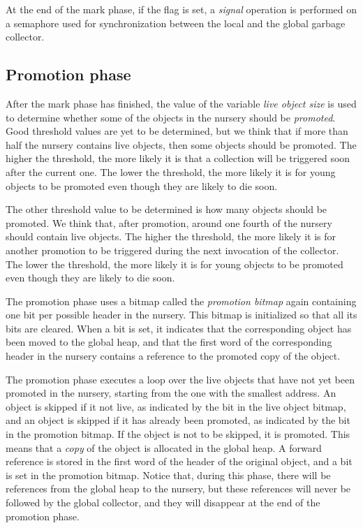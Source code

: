 At the end of the mark phase, if the flag is set, a \emph{signal}
operation is performed on a semaphore used for synchronization between
the local and the global garbage collector.

\subsection{Promotion phase}

After the mark phase has finished, the value of the variable
\emph{live object size} is used to determine whether some of the
objects in the nursery should be \emph{promoted}.  Good threshold
values are yet to be determined, but we think that if more than half
the nursery contains live objects, then some objects should be
promoted.  The higher the threshold, the more likely it is that a
collection will be triggered soon after the current one.  The lower
the threshold, the more likely it is for young objects to be promoted
even though they are likely to die soon.

The other threshold value to be determined is how many objects should
be promoted.  We think that, after promotion, around one fourth of the
nursery should contain live objects.  The higher the threshold, the
more likely it is for another promotion to be triggered during the
next invocation of the collector.  The lower the threshold, the more
likely it is for young objects to be promoted even though they are
likely to die soon.

The promotion phase uses a bitmap called the \emph{promotion bitmap}
again containing one bit per possible header in the nursery.  This
bitmap is initialized so that all its bits are cleared.  When a bit is
set, it indicates that the corresponding object has been moved to the
global heap, and that the first word of the corresponding header in
the nursery contains a reference to the promoted copy of the object.

The promotion phase executes a loop over the live objects that have
not yet been promoted in the nursery, starting from the one with the
smallest address.  An object is skipped if it not live, as indicated
by the bit in the live object bitmap, and an object is skipped if it
has already been promoted, as indicated by the bit in the promotion
bitmap.  If the object is not to be skipped, it is promoted.  This
means that a \emph{copy} of the object is allocated in the global
heap.  A forward reference is stored in the first word of the header
of the original object, and a bit is set in the promotion bitmap.
Notice that, during this phase, there will be references from the
global heap to the nursery, but these references will never be
followed by the global collector, and they will disappear at the end
of the promotion phase.

